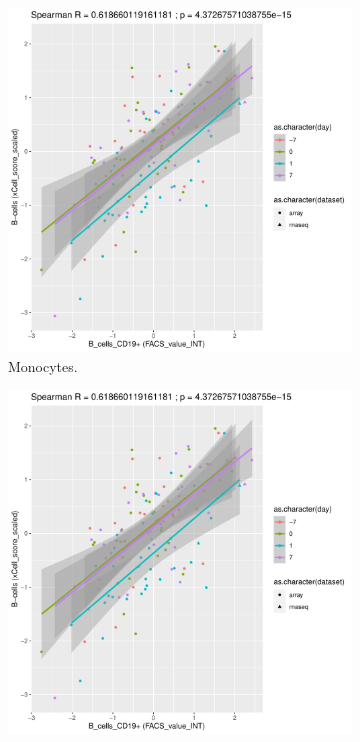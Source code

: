 \begin{figure}
    \centering
    \begin{subfigure}[b]{0.43\textwidth}
        \centering
        \includegraphics[width=1.0\textwidth,page=6]{mainmatter/figures/chapter_03/validate_xCell_estimates.cell_type_pairs.pdf}
        \caption{Monocytes.}
    \end{subfigure}%
    \vspace{1em}\vfill%
    \begin{subfigure}[b]{0.43\textwidth}
        \centering
        \includegraphics[width=1.0\textwidth,page=3]{mainmatter/figures/chapter_03/validate_xCell_estimates.cell_type_pairs.pdf}

\end{subfigure}
\end{figure}
